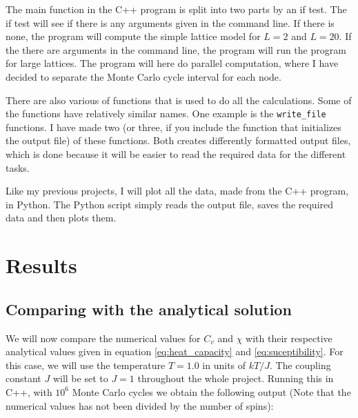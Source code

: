 \documentclass[12pt]{article}
\begin{document}
The main function in the C++ program is split into two parts by an if test. The if test will see if there is any arguments given in the command line. If there is none, the program will compute the simple lattice model for $L = 2$ and $L = 20$. If the there are arguments in the command line, the program will run the program for large lattices. The program will here do parallel computation, where I have decided to separate the Monte Carlo cycle interval for each node. 

There are also various of functions that is used to do all the calculations. Some of the functions have relatively similar names. One example is the \texttt{write\_file} functions. I have made two (or three, if you include the function that initializes the output file) of these functions. Both creates differently formatted output files, which is done because it will be easier to read the required data for the different tasks. 

Like my previous projects, I will plot all the data, made from the C++ program, in Python. The Python script simply reads the output file, saves the required data and then plots them.
\section{Results} \label{section:result}
\subsection{Comparing with the analytical solution}
We will now compare the numerical values for $C_v$ and $\chi$ with their respective analytical values given in equation \ref{eq:heat_capacity} and \ref{eq:suceptibility}. For this case, we will use the temperature $T = 1.0$ in units of $kT/J$. The coupling constant $J$ will be set to $J=1$ throughout the whole project. Running this in C++, with $10^6$ Monte Carlo cycles we obtain the following output (Note that the numerical values has not been divided by the number of spins):
\end{document}
